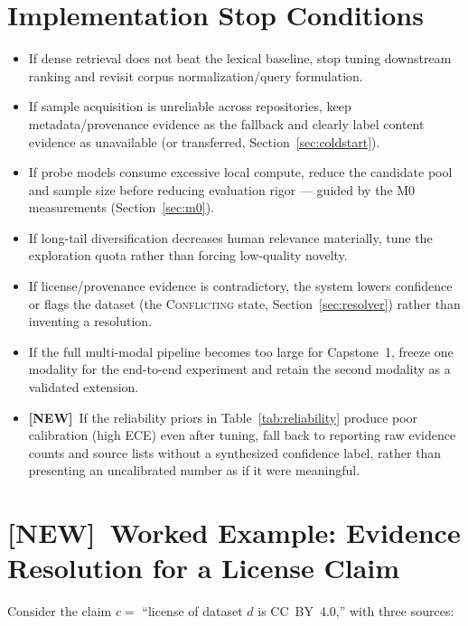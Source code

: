 \documentclass[11pt]{article}
\newcommand{\newtag}{\textcolor{accent}{\textbf{[NEW]}}\ }
\begin{document}
\section{Implementation Stop Conditions}
\begin{itemize}[leftmargin=*]
\item If dense retrieval does not beat the lexical baseline, stop tuning downstream ranking and revisit
      corpus normalization/query formulation.
\item If sample acquisition is unreliable across repositories, keep metadata/provenance evidence as the
      fallback and clearly label content evidence as unavailable (or transferred, Section~\ref{sec:coldstart}).
\item If probe models consume excessive local compute, reduce the candidate pool and sample size before
      reducing evaluation rigor --- guided by the M0 measurements (Section~\ref{sec:m0}).
\item If long-tail diversification decreases human relevance materially, tune the exploration quota rather
      than forcing low-quality novelty.
\item If license/provenance evidence is contradictory, the system lowers confidence or flags the dataset
      (the \textsc{Conflicting} state, Section~\ref{sec:resolver}) rather than inventing a resolution.
\item If the full multi-modal pipeline becomes too large for Capstone~1, freeze one modality for the
      end-to-end experiment and retain the second modality as a validated extension.
\item \newtag If the reliability priors in Table~\ref{tab:reliability} produce poor calibration (high ECE)
      even after tuning, fall back to reporting raw evidence counts and source lists without a synthesized
      confidence label, rather than presenting an uncalibrated number as if it were meaningful.
\end{itemize}

\section{\newtag Worked Example: Evidence Resolution for a License Claim}
\label{app:worked-example}
Consider the claim $c = $ ``license of dataset $d$ is CC~BY~4.0,'' with three sources:
\end{document}
